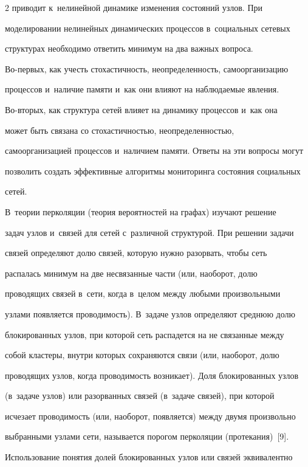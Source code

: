 \begin{multicols}{2}
приводит к~нелинейной динамике изменения состояний узлов. При 


моделировании нелинейных динамических процессов в~социальных сетевых 


структурах необходимо ответить минимум на два важных вопроса.  


Во-пер\-вых, как учесть стохастичность, неопределенность, самоорганизацию 


процессов и~наличие памяти и~как они влияют на наблюдаемые явления.  


Во-вто\-рых, как структура сетей влияет на динамику процессов и~как она 


может быть связана со стохастичностью, неопределенностью, 


самоорганизацией процессов и~наличием памяти. Ответы на эти вопросы могут 


позволить создать эффективные алгоритмы мониторинга состояния социальных 


сетей.


   


  В~теории перколяции (теория вероятностей на графах) изучают решение 


задач узлов и~связей для сетей с~различной структурой. При решении задачи 


связей определяют долю связей, которую нужно разорвать, чтобы сеть 


распалась минимум на две несвязанные части (или, наоборот, долю 


проводящих связей в~сети, когда в~целом между любыми произвольными 


узлами появляется проводимость). В~задаче узлов определяют среднюю долю 


блокированных узлов, при которой сеть распадется на не связанные между 


собой кластеры, внутри которых сохраняются связи (или, наоборот, долю 


проводящих узлов, когда проводимость возникает). Доля блокированных узлов 


(в~задаче узлов) или разорванных связей (в~задаче связей), при которой 


исчезает проводимость (или, наоборот, появляется) между двумя произвольно 


выбранными узлами сети, называется порогом перколяции (протекания)~[9].


  


  Использование понятия долей блокированных узлов или связей эквивалентно 



\end{multicols}
